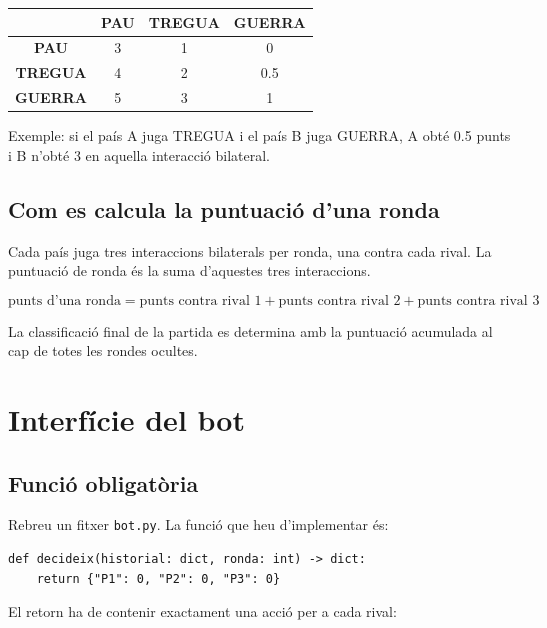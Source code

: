 \documentclass[12pt,a4paper]{report}
\begin{document}
\begin{center}
\renewcommand{\arraystretch}{1.25}
\begin{tabular}{c|ccc}
 & \textbf{PAU} & \textbf{TREGUA} & \textbf{GUERRA} \\
\hline
\textbf{PAU} & 3 & 1 & 0 \\
\textbf{TREGUA} & 4 & 2 & 0.5 \\
\textbf{GUERRA} & 5 & 3 & 1 \\
\end{tabular}
\end{center}

Exemple: si el país A juga TREGUA i el país B juga GUERRA, A obté 0.5 punts i
B n'obté 3 en aquella interacció bilateral.

\section{Com es calcula la puntuació d'una ronda}

Cada país juga tres interaccions bilaterals per ronda, una contra cada rival.
La puntuació de ronda és la suma d'aquestes tres interaccions.

\begin{tcolorbox}[colback=softgray,colframe=black,title=Fórmula de puntuació]
\[
\text{punts d'una ronda}
=
\text{punts contra rival 1}
+
\text{punts contra rival 2}
+
\text{punts contra rival 3}
\]
\end{tcolorbox}

La classificació final de la partida es determina amb la puntuació acumulada al
cap de totes les rondes ocultes.

\chapter{Interfície del bot}

\section{Funció obligatòria}

Rebreu un fitxer \texttt{bot.py}. La funció que heu d'implementar és:

\begin{verbatim}
def decideix(historial: dict, ronda: int) -> dict:
    return {"P1": 0, "P2": 0, "P3": 0}
\end{verbatim}

El retorn ha de contenir exactament una acció per a cada rival:
\end{document}
